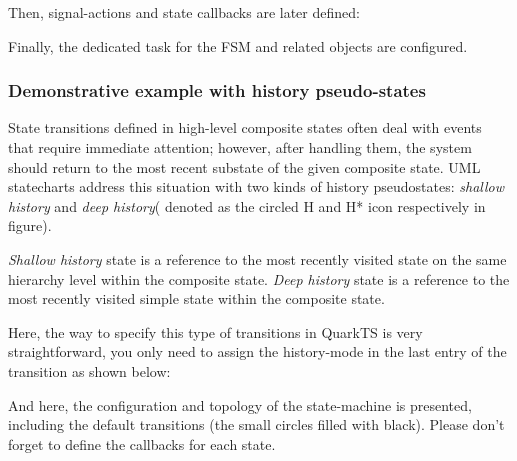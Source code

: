 

Then, signal-actions and state callbacks are later defined:
\medskip



Finally, the dedicated task for the FSM and related objects are configured.
\medskip


\subsubsection{Demonstrative example with history pseudo-states} 

State transitions defined in high-level composite states often deal with events that require immediate attention; however, after handling them, the system should return to the most recent substate of the given composite state.  UML statecharts address this situation with two kinds of history pseudostates: \textit{shallow history} and \textit{deep history}( denoted as the circled H and H* icon respectively in figure).



\textit{Shallow history} state is a reference to the most recently visited state on the same hierarchy level within the composite state.
\textit{Deep history} state is a reference to the most recently visited simple state within the composite state.

Here, the way to specify this type of transitions in QuarkTS is very straightforward, you only need to assign the history-mode in the last entry of the transition as shown below:
\medskip



And here, the configuration and topology of the state-machine is presented, including the default transitions (the small circles filled with black). Please don't forget to define the callbacks for each state.

\medskip
